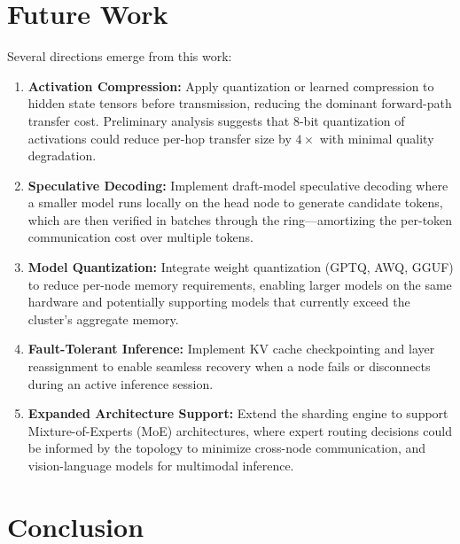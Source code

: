 \documentclass[runningheads]{llncs}
\begin{document}
\section{Future Work}
\label{sec:future}

Several directions emerge from this work:

\begin{enumerate}
    \item \textbf{Activation Compression:} Apply quantization or learned compression to hidden state tensors before transmission, reducing the dominant forward-path transfer cost. Preliminary analysis suggests that 8-bit quantization of activations could reduce per-hop transfer size by $4\times$ with minimal quality degradation.

    \item \textbf{Speculative Decoding:} Implement draft-model speculative decoding where a smaller model runs locally on the head node to generate candidate tokens, which are then verified in batches through the ring---amortizing the per-token communication cost over multiple tokens.

    \item \textbf{Model Quantization:} Integrate weight quantization (GPTQ, AWQ, GGUF) to reduce per-node memory requirements, enabling larger models on the same hardware and potentially supporting models that currently exceed the cluster's aggregate memory.

    \item \textbf{Fault-Tolerant Inference:} Implement KV cache checkpointing and layer reassignment to enable seamless recovery when a node fails or disconnects during an active inference session.

    \item \textbf{Expanded Architecture Support:} Extend the sharding engine to support Mixture-of-Experts (MoE) architectures, where expert routing decisions could be informed by the topology to minimize cross-node communication, and vision-language models for multimodal inference.
\end{enumerate}

\section{Conclusion}
\label{sec:conclusion}
\end{document}
